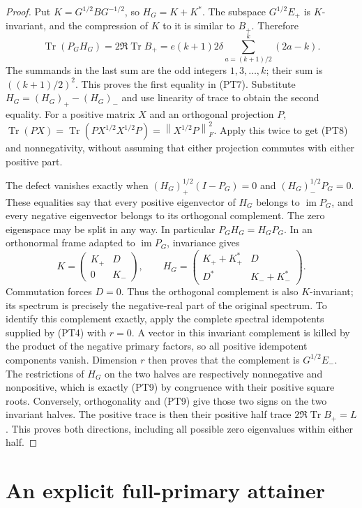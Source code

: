 \documentclass[11pt]{article}
\newcommand{\norm}[1]{\left\lVert#1\right\rVert}
\DeclareMathOperator{\Tr}{Tr}
\DeclareMathOperator{\im}{im}
\begin{document}
\begin{proof}
Put \(K=G^{1/2}BG^{-1/2}\), so \(H_G=K+K^*\).
The subspace \(G^{1/2}E_+\) is \(K\)-invariant, and the
compression of \(K\) to it is similar to \(B_+\). Therefore
\[
 \Tr(P_GH_G)=2\Re\Tr B_+
 =e(k+1)2\delta\sum_{a=(k+1)/2}^k(2a-k).
\]
The summands in the last sum are the odd integers
\(1,3,\ldots,k\); their sum is \(((k+1)/2)^2\). This proves
the first equality in (PT7). Substitute
\(H_G=(H_G)_+-(H_G)_-\) and use linearity of trace to obtain
the second equality. For a positive matrix \(X\) and an orthogonal
projection \(P\),
\(\Tr(PX)=\Tr(PX^{1/2}X^{1/2}P)=\norm{X^{1/2}P}_F^2\).
Apply this twice to get (PT8) and nonnegativity, without assuming
that either projection commutes with either positive part.

The defect vanishes exactly when
\((H_G)_+^{1/2}(I-P_G)=0\) and \((H_G)_-^{1/2}P_G=0\).
These equalities say that every positive eigenvector of \(H_G\)
belongs to \(\im P_G\), and every negative eigenvector belongs
to its orthogonal complement. The zero eigenspace may be split in
any way. In particular \(P_GH_G=H_GP_G\).
In an orthonormal frame adapted to \(\im P_G\), invariance gives
\[
 K=\begin{pmatrix}K_+&D\\0&K_-\end{pmatrix},\qquad
 H_G=\begin{pmatrix}K_++K_+^*&D\\D^*&K_-+K_-^*\end{pmatrix}.
\]
Commutation forces \(D=0\). Thus the orthogonal complement is
also \(K\)-invariant; its spectrum is precisely the negative-real
part of the original spectrum. To identify this complement exactly,
apply the complete spectral idempotents supplied by (PT4) with
\(r=0\). A vector in this invariant complement is killed by the
product of the negative primary factors, so all positive idempotent
components vanish. Dimension \(r\) then proves that the complement
is \(G^{1/2}E_-\). The restrictions of \(H_G\) on the two halves
are respectively nonnegative and nonpositive, which is exactly
(PT9) by congruence with their positive square roots.
Conversely, orthogonality and (PT9) give those two signs on the
two invariant halves. The positive trace is then their positive
half trace \(2\Re\Tr B_+=L\). This proves both directions,
including all possible zero eigenvalues within either half.
\end{proof}

\section{An explicit full-primary attainer}
\end{document}

